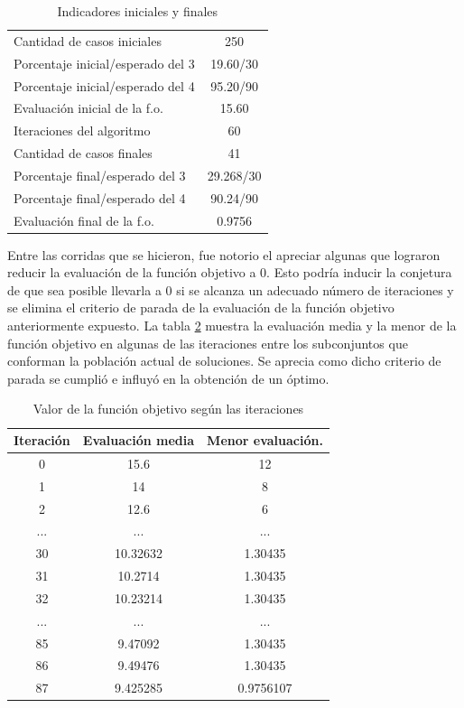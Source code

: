 \documentclass[a4paper,12pt]{book}
\begin{document}
	\begin{table}[h]
		\begin{center}
			\begin{tabular}{| l | c |} \hline
				Cantidad de casos iniciales & 250 \\
				Porcentaje inicial/esperado del 3 & 19.60/30 \\
				Porcentaje inicial/esperado del 4 & 95.20/90 \\
				Evaluación inicial de la f.o. & 15.60 \\ \hline
				Iteraciones del algoritmo & 60 \\ \hline
				Cantidad de casos finales & 41 \\
				Porcentaje final/esperado del 3 & 29.268/30 \\
				Porcentaje final/esperado del 4 & 90.24/90 \\
				Evaluación final de la f.o. & 0.9756 \\ \hline
			\end{tabular}
			\caption{Indicadores iniciales y finales}
			\label{tab:IndicadoresGen1}
		\end{center}
	\end{table}

	Entre las corridas que se hicieron, fue notorio el apreciar algunas que lograron reducir la evaluación de la función objetivo a 0. Esto podría inducir la conjetura de que sea posible llevarla a 0 si se alcanza un adecuado número de iteraciones y se elimina el criterio de parada de la evaluación de la función objetivo anteriormente expuesto. La tabla \ref{tab:foGen1} muestra la evaluación media y la menor de la función objetivo en algunas de las iteraciones entre los subconjuntos que conforman la población actual de soluciones. Se aprecia como dicho criterio de parada se cumplió e influyó en la obtención de un óptimo.


	\begin{table}[h]
		\begin{center}
			\begin{tabular}{| c | c | c |} \hline
				Iteración & Evaluación media & Menor evaluación. \\ \hline
				0 & 15.6 & 12 \\
				1 & 14 & 8 \\
				2 & 12.6 & 6 \\
				... & ... & ... \\
				30 & 10.32632 & 1.30435\\
				31 & 10.2714 & 1.30435\\
				32 & 10.23214 & 1.30435\\
				... & ... & ...\\
				85 & 9.47092 & 1.30435\\
				86 & 9.49476 & 1.30435\\
				87 & 9.425285 & 0.9756107 \\ \hline
			\end{tabular}
			\caption{Valor de la función objetivo según las iteraciones}
			\label{tab:foGen1}
		\end{center}
	\end{table}
\end{document}
